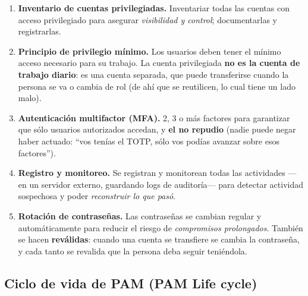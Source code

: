 \documentclass[11pt,a4paper]{article}
\begin{document}
\begin{enumerate}[leftmargin=1.6em,itemsep=3pt]
  \item \textbf{Inventario de cuentas privilegiadas.} Inventariar todas las cuentas con acceso
        privilegiado para asegurar \emph{visibilidad y control}; documentarlas y registrarlas.
  \item \textbf{Principio de privilegio mínimo.} Los usuarios deben tener el mínimo acceso
        necesario para su trabajo. La cuenta privilegiada \textbf{no es la cuenta de trabajo
        diario}: es una cuenta separada, que puede transferirse cuando la persona se va o cambia
        de rol (de ahí que se reutilicen, lo cual tiene un lado malo).
  \item \textbf{Autenticación multifactor (MFA).} 2, 3 o más factores para garantizar que sólo
        usuarios autorizados accedan, y \textbf{el no repudio} (nadie puede negar haber actuado:
        ``vos tenías el TOTP, sólo vos podías avanzar sobre esos factores'').
  \item \textbf{Registro y monitoreo.} Se registran y monitorean todas las actividades —en un
        servidor externo, guardando logs de auditoría— para detectar actividad sospechosa y
        poder \emph{reconstruir lo que pasó}.
  \item \textbf{Rotación de contraseñas.} Las contraseñas se cambian regular y automáticamente
        para reducir el riesgo de \emph{compromisos prolongados}. También se hacen
        \textbf{reválidas}: cuando una cuenta se transfiere se cambia la contraseña, y cada
        tanto se revalida que la persona deba seguir teniéndola.
\end{enumerate}

\subsection{Ciclo de vida de PAM (PAM Life cycle)}

\begin{center}
\end{center}
\end{document}
